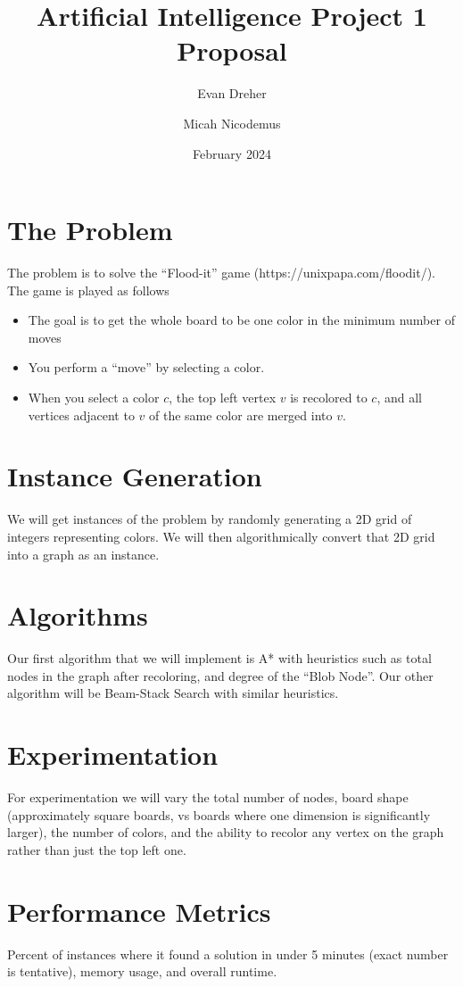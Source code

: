 \documentclass{article}
\author{
    Evan Dreher \\
    \and
    Micah Nicodemus
}
\title{Artificial Intelligence Project 1 Proposal}
\date{February 2024}
\begin{document}
\maketitle

\section{The Problem}
\par The problem is to solve the ``Flood-it'' game (https://unixpapa.com/floodit/). The game is played as follows
\begin{itemize}
    \item The goal is to get the whole board to be one color in the minimum number of moves
    \item You perform a ``move'' by selecting a color.
    \item When you select a color $c$, the top left vertex $v$ is recolored to $c$, and all vertices adjacent to $v$ of the same color are merged into $v$. 
\end{itemize}

\section{Instance Generation}
\par We will get instances of the problem by randomly generating a 2D grid of integers representing colors. We will then algorithmically convert that 2D grid into a graph as an instance.

\section{Algorithms}
\par Our first algorithm that we will implement is A* with heuristics such as total nodes in the graph after recoloring, and degree of the ``Blob Node''. Our other algorithm will be Beam-Stack Search with similar heuristics.

\section{Experimentation}
\par For experimentation we will vary the total number of nodes, board shape (approximately square boards, vs boards where one dimension is significantly larger), the number of colors, and the ability to recolor any vertex on the graph rather than just the top left one.

\section{Performance Metrics}
\par Percent of instances where it found a solution in under 5 minutes (exact number is tentative), memory usage, and overall runtime.
\end{document}
